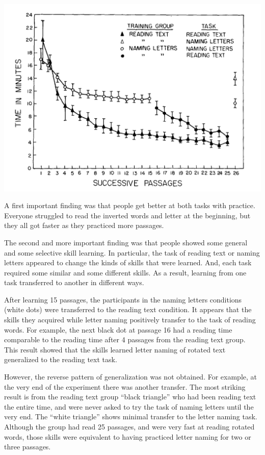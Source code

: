 \documentclass[
  oneside,
  12pt]{crumpbook}
\begin{document}
\begin{center}\includegraphics[width=1\linewidth]{imgs/Procedures_transfer} \end{center}

A first important finding was that people get better at both tasks with practice. Everyone struggled to read the inverted words and letter at the beginning, but they all got faster as they practiced more passages.

The second and more important finding was that people showed some general and some selective skill learning. In particular, the task of reading text or naming letters appeared to change the kinds of skills that were learned. And, each task required some similar and some different skills. As a result, learning from one task transferred to another in different ways.

After learning 15 passages, the participants in the naming letters conditions (white dots) were transferred to the reading text condition. It appears that the skills they acquired while letter naming positively transfer to the task of reading words. For example, the next black dot at passage 16 had a reading time comparable to the reading time after 4 passages from the reading text group. This result showed that the skills learned letter naming of rotated text generalized to the reading text task.

However, the reverse pattern of generalization was not obtained. For example, at the very end of the experiment there was another transfer. The most striking result is from the reading text group ``black triangle'' who had been reading text the entire time, and were never asked to try the task of naming letters until the very end. The ``white triangle'' shows minimal transfer to the letter naming task. Although the group had read 25 passages, and were very fast at reading rotated words, those skills were equivalent to having practiced letter naming for two or three passages.
\end{document}
